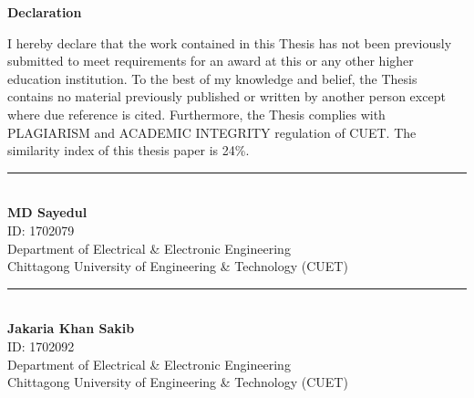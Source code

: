   

\centerline{
\Large{\textbf{Declaration}
}
}
\vspace{1cm}
I hereby declare that the work contained in this Thesis has not been previously submitted to meet requirements for an award at this or any other higher education institution. To the best of my knowledge and belief, the Thesis contains no material previously published or written by another person except where due reference is cited. Furthermore, the Thesis complies with PLAGIARISM and ACADEMIC INTEGRITY regulation of CUET. The similarity index of this thesis paper is 24\%.

\vspace{2cm}


\begin{flushright}
\rule{0.25\columnwidth}{1pt} \\[1.2ex]
{
    \textbf{MD Sayedul} \\
    ID: 1702079\\
    Department of Electrical \& Electronic Engineering \\
    Chittagong University of Engineering \& Technology (CUET)
}
\end{flushright}
\vspace{2cm}

\begin{flushright}
\rule{0.35\columnwidth}{1pt} \\[1.2ex]
{
    \textbf{Jakaria Khan Sakib} \\
    ID: 1702092\\
    Department of Electrical \& Electronic Engineering \\
    Chittagong University of Engineering \& Technology (CUET)
}
\end{flushright}
\newpage